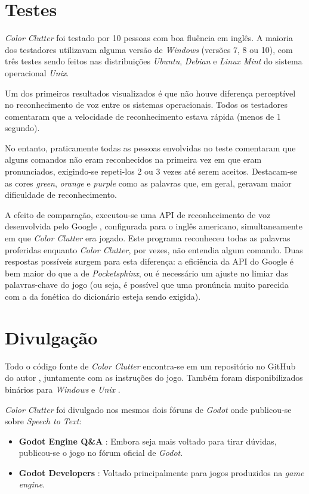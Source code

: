 
\section{Testes}

\textit{Color Clutter} foi testado por 10 pessoas com boa fluência em inglês. A maioria dos testadores utilizavam alguma versão de \textit{Windows} (versões 7, 8 ou 10), com três testes sendo feitos nas distribuições \textit{Ubuntu}, \textit{Debian} e \textit{Linux Mint} do sistema operacional \textit{Unix}.

Um dos primeiros resultados visualizados é que não houve diferença perceptível no reconhecimento de voz entre os sistemas operacionais. Todos os testadores comentaram que a velocidade de reconhecimento estava rápida (menos de 1 segundo).

No entanto, praticamente todas as pessoas envolvidas no teste comentaram que alguns comandos não eram reconhecidos na primeira vez em que eram pronunciados, exigindo-se repeti-los 2 ou 3 vezes até serem aceitos. Destacam-se as cores \textit{green}, \textit{orange} e \textit{purple} como as palavras que, em geral, geravam maior dificuldade de reconhecimento.

A efeito de comparação, executou-se uma API de reconhecimento de voz desenvolvida pelo Google \citep{googleSpeechAPI}, configurada para o inglês americano, simultaneamente em que \textit{Color Clutter} era jogado. Este programa reconheceu todas as palavras proferidas enquanto \textit{Color Clutter}, por vezes, não entendia algum comando. Duas respostas possíveis surgem para esta diferença: a eficiência da API do Google é bem maior do que a de \textit{Pocketsphinx}, ou é necessário um ajuste no limiar das palavras-chave do jogo (ou seja, é possível que uma pronúncia muito parecida com a da fonética do dicionário esteja sendo exigida).


\section{Divulgação}

Todo o código fonte de \textit{Color Clutter} encontra-se em um repositório no GitHub do autor \citep{colorClutterGitHub}, juntamente com as instruções do jogo. Também foram disponibilizados binários para \textit{Windows} e \textit{Unix} \citep{colorClutterDownload}.

\textit{Color Clutter} foi divulgado nos mesmos dois fóruns de \textit{Godot} onde publicou-se sobre \textit{Speech to Text}:

\begin{itemize}
\item \textbf{Godot Engine Q\&A} \citep{colorClutterGodotQA}: Embora seja mais voltado para tirar dúvidas, publicou-se o jogo no fórum oficial de \textit{Godot}.

\item \textbf{Godot Developers} \citep{colorClutterGodotDevelopers}: Voltado principalmente para jogos produzidos na \textit{game engine}.
\end{itemize}
